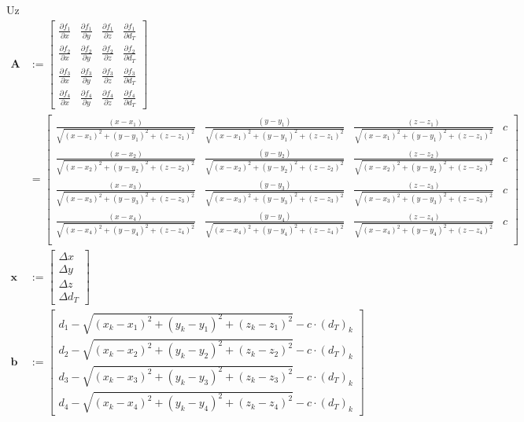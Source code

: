 \documentclass[a4paper,twoside,12pt]{memoir} %
\begin{document}
Uz 
\begin{align}
\mathbf{A} & := \begin{bmatrix}
\frac{\partial f_1}{\partial x} &
\frac{\partial f_1}{\partial y} &
\frac{\partial f_1}{\partial z} &
\frac{\partial f_1}{\partial d_T} \\
\frac{\partial f_2}{\partial x} &
\frac{\partial f_2}{\partial y} &
\frac{\partial f_2}{\partial z} &
\frac{\partial f_2}{\partial d_T} \\
\frac{\partial f_3}{\partial x} &
\frac{\partial f_3}{\partial y} &
\frac{\partial f_3}{\partial z} &
\frac{\partial f_3}{\partial d_T} \\
\frac{\partial f_4}{\partial x} &
\frac{\partial f_4}{\partial y} &
\frac{\partial f_4}{\partial z} &
\frac{\partial f_4}{\partial d_T}
\end{bmatrix} \\
& = \begin{bmatrix}
\frac{(x-x_1)}{\sqrt{(x-x_1)^{2}+(y-y_1)^{2}+(z-z_1)^{2}}} & \frac{(y-y_1)}{\sqrt{(x-x_1)^{2}+(y-y_1)^{2}+(z-z_1)^{2}}} & \frac{(z-z_1)}{\sqrt{(x-x_1)^{2}+(y-y_1)^{2}+(z-z_1)^{2}}} & c \\
\frac{(x-x_2)}{\sqrt{(x-x_2)^{2}+(y-y_2)^{2}+(z-z_2)^{2}}} & \frac{(y-y_2)}{\sqrt{(x-x_2)^{2}+(y-y_2)^{2}+(z-z_2)^{2}}} & \frac{(z-z_2)}{\sqrt{(x-x_2)^{2}+(y-y_2)^{2}+(z-z_2)^{2}}} & c \\
\frac{(x-x_3)}{\sqrt{(x-x_3)^{2}+(y-y_3)^{2}+(z-z_3)^{2}}} & \frac{(y-y_3)}{\sqrt{(x-x_3)^{2}+(y-y_3)^{2}+(z-z_3)^{2}}} & \frac{(z-z_3)}{\sqrt{(x-x_3)^{2}+(y-y_3)^{2}+(z-z_3)^{2}}} & c \\
\frac{(x-x_4)}{\sqrt{(x-x_4)^{2}+(y-y_4)^{2}+(z-z_4)^{2}}} & \frac{(y-y_4)}{\sqrt{(x-x_4)^{2}+(y-y_4)^{2}+(z-z_4)^{2}}} & \frac{(z-z_4)}{\sqrt{(x-x_4)^{2}+(y-y_4)^{2}+(z-z_4)^{2}}} & c \\
\end{bmatrix}\\
\mathbf{x} & :=  \begin{bmatrix}
\Delta x \\
\Delta y \\
\Delta z \\
\Delta d_T
\end{bmatrix}\\
\mathbf{b} & := \begin{bmatrix}
d_1 - \sqrt{(x_k-x_1)^{2}+(y_k-y_1)^{2}+(z_k-z_1)^{2}} - c\cdot (d_T)_k \\
d_2 - \sqrt{(x_k-x_2)^{2}+(y_k-y_2)^{2}+(z_k-z_2)^{2}} - c\cdot (d_T)_k \\
d_3 - \sqrt{(x_k-x_3)^{2}+(y_k-y_3)^{2}+(z_k-z_3)^{2}} - c\cdot (d_T)_k \\
d_4 - \sqrt{(x_k-x_4)^{2}+(y_k-y_4)^{2}+(z_k-z_4)^{2}} - c\cdot (d_T)_k
\end{bmatrix}
\end{align}
\end{document}
